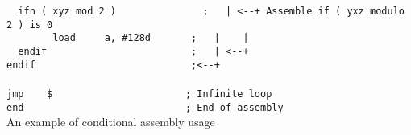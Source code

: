 \begin{code}[h!]
    \verb'  ifn ( xyz mod 2 )               ;   | <--+ Assemble if ( yxz modulo 2 ) is 0'\\
    \verb'        load     a, #128d       ;   |    |'\\
    \verb'  endif                         ;   | <--+'\\
    \verb'endif                           ;<--+'\\
    \verb''\\
    \verb'jmp    $                       ; Infinite loop'\\
    \verb'end                            ; End of assembly'\\
    \caption{An example of conditional assembly usage}
\end{code}
